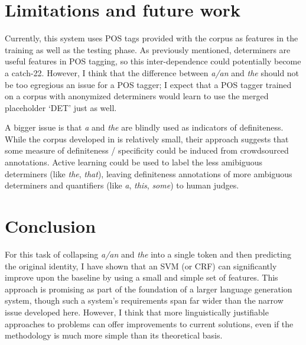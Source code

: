 \documentclass[11pt]{article}\usepackage{graphicx, color}
\begin{document}

\section{Limitations and future work}
Currently, this system uses POS tags provided with the corpus as features in the training as well as the testing phase. As previously mentioned, determiners are useful features in POS tagging, so this inter-dependence could potentially become a catch-22. However, I think that the difference between \emph{a/an} and \emph{the} should not be too egregious an issue for a POS tagger; I expect that a POS tagger trained on a corpus with anonymized determiners would learn to use the merged placeholder `DET' just as well.

A bigger issue is that \emph{a} and \emph{the} are blindly used as indicators of definiteness. While the corpus developed in \citet{vieira:2000} is relatively small, their approach suggests that some measure of definiteness / specificity could be induced from crowdsourced annotations. Active learning could be used to label the less amibiguous determiners (like \emph{the}, \emph{that}), leaving definiteness annotations of more ambiguous determiners and quantifiers (like \emph{a}, \emph{this}, \emph{some}) to human judges.

\section{Conclusion}
For this task of collapsing \emph{a/an} and \emph{the} into a single token and then predicting the original identity, I have shown that an SVM (or CRF) can significantly improve upon the baseline by using a small and simple set of features. This approach is promising as part of the foundation of a larger language generation system, though such a system's requirements span far wider than the narrow issue developed here. However, I think that more linguistically justifiable approaches to problems can offer improvements to current solutions, even if the methodology is much more simple than its theoretical basis.
\end{document}

